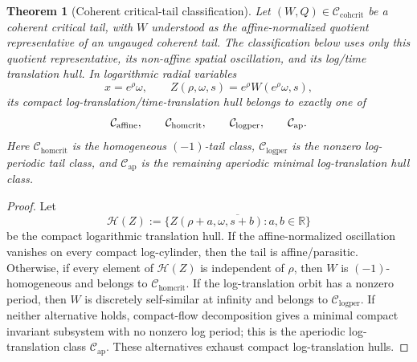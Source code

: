 \documentclass[11pt]{amsart}
\numberwithin{equation}{section}
\theoremstyle{plain}
\newtheorem{theorem}{Theorem}[section]
\theoremstyle{definition}
\theoremstyle{remark}
\newcommand{\R}{\mathbb R}
\newcommand{\Ccohcrit}{\mathcal C_{\mathrm{cohcrit}}}
\newcommand{\Chomcrit}{\mathcal C_{\mathrm{homcrit}}}
\newcommand{\Clogper}{\mathcal C_{\mathrm{logper}}}
\newcommand{\Capcrit}{\mathcal C_{\mathrm{ap}}}
\begin{document}
\begin{theorem}[Coherent critical-tail classification]
\label{thm:coherent-critical-tail-classification}
Let \((W,Q)\in\Ccohcrit\) be a coherent critical tail, with \(W\) understood as
the affine-normalized quotient representative of an ungauged coherent tail.  The
classification below uses only this quotient representative, its non-affine
spatial oscillation, and its log/time translation hull.  In logarithmic radial
variables
\[
   x=e^\rho\omega,\qquad Z(\rho,\omega,s)=e^\rho W(e^\rho\omega,s),
\]
its compact log-translation/time-translation hull belongs to exactly one of
\[
   \mathcal C_{\rm affine},\qquad
   \Chomcrit,\qquad
   \Clogper,\qquad
   \Capcrit .
\]
Here \(\Chomcrit\) is the homogeneous \((-1)\)-tail class,
\(\Clogper\) is the nonzero log-periodic tail class, and \(\Capcrit\) is the
remaining aperiodic minimal log-translation hull class.
\end{theorem}

\begin{proof}
Let
\[
   \mathcal H(Z):=
   \overline{\{Z(\rho+a,\omega,s+b):a,b\in\R\}}
\]
be the compact logarithmic translation hull.  If the affine-normalized
oscillation vanishes on every compact log-cylinder, then the tail is
affine/parasitic.  Otherwise, if every element of \(\mathcal H(Z)\) is independent of
\(\rho\), then \(W\) is \((-1)\)-homogeneous and belongs to \(\Chomcrit\).  If
the log-translation orbit has a nonzero period, then \(W\) is discretely
self-similar at infinity and belongs to \(\Clogper\).  If neither alternative
holds, compact-flow decomposition gives a minimal compact invariant subsystem
with no nonzero log period; this is the aperiodic log-translation class
\(\Capcrit\).  These alternatives exhaust compact log-translation hulls.
\end{proof}
\end{document}
